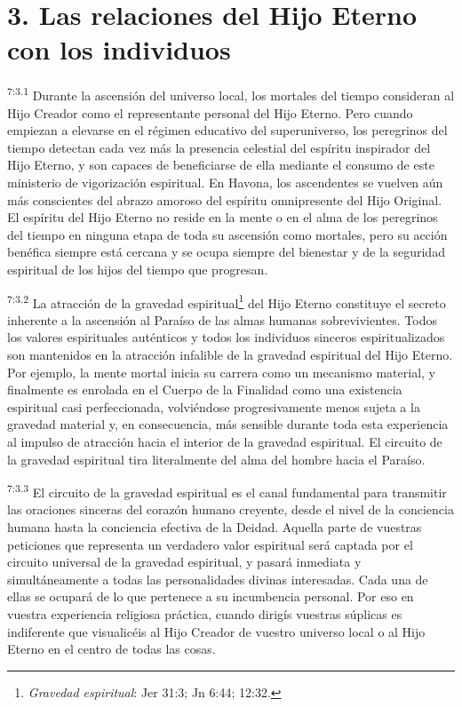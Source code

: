 \section*{3. Las relaciones del Hijo Eterno con los individuos}
\par
\textsuperscript{7:3.1} Durante la ascensión del universo local, los mortales del tiempo consideran al Hijo Creador como el representante personal del Hijo Eterno. Pero cuando empiezan a elevarse en el régimen educativo del superuniverso, los peregrinos del tiempo detectan cada vez más la presencia celestial del espíritu inspirador del Hijo Eterno, y son capaces de beneficiarse de ella mediante el consumo de este ministerio de vigorización espiritual. En Havona, los ascendentes se vuelven aún más conscientes del abrazo amoroso del espíritu omnipresente del Hijo Original. El espíritu del Hijo Eterno no reside en la mente o en el alma de los peregrinos del tiempo en ninguna etapa de toda su ascensión como mortales, pero su acción benéfica siempre está cercana y se ocupa siempre del bienestar y de la seguridad espiritual de los hijos del tiempo que progresan.

\par
\textsuperscript{7:3.2} La atracción de la gravedad espiritual\footnote{\textit{Gravedad espiritual}: Jer 31:3; Jn 6:44; 12:32.} del Hijo Eterno constituye el secreto inherente a la ascensión al Paraíso de las almas humanas sobrevivientes. Todos los valores espirituales auténticos y todos los individuos sinceros espiritualizados son mantenidos en la atracción infalible de la gravedad espiritual del Hijo Eterno. Por ejemplo, la mente mortal inicia su carrera como un mecanismo material, y finalmente es enrolada en el Cuerpo de la Finalidad como una existencia espiritual casi perfeccionada, volviéndose progresivamente menos sujeta a la gravedad material y, en consecuencia, más sensible durante toda esta experiencia al impulso de atracción hacia el interior de la gravedad espiritual. El circuito de la gravedad espiritual tira literalmente del alma del hombre hacia el Paraíso.

\par
\textsuperscript{7:3.3} El circuito de la gravedad espiritual es el canal fundamental para transmitir las oraciones sinceras del corazón humano creyente, desde el nivel de la conciencia humana hasta la conciencia efectiva de la Deidad. Aquella parte de vuestras peticiones que representa un verdadero valor espiritual será captada por el circuito universal de la gravedad espiritual, y pasará inmediata y simultáneamente a todas las personalidades divinas interesadas. Cada una de ellas se ocupará de lo que pertenece a su incumbencia personal. Por eso en vuestra experiencia religiosa práctica, cuando dirigís vuestras súplicas es indiferente que visualicéis al Hijo Creador de vuestro universo local o al Hijo Eterno en el centro de todas las cosas.

